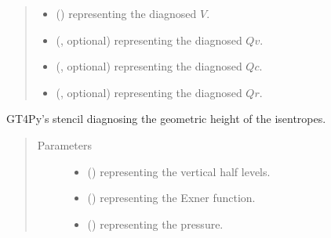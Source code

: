 \documentclass[letterpaper,10pt,english]{sphinxmanual}
\begin{document}
\begin{fulllineitems}
\begin{fulllineitems}
\begin{quote}
\begin{description}
\begin{itemize}
\item {} 
 () \textendash{}  representing the diagnosed \(V\).

\item {} 
 (, optional) \textendash{}  representing the diagnosed \(Qv\).

\item {} 
 (, optional) \textendash{}  representing the diagnosed \(Qc\).

\item {} 
 (, optional) \textendash{}  representing the diagnosed \(Qr\).

\end{itemize}


\end{description}\end{quote}

\end{fulllineitems}


\begin{fulllineitems}
\label{\detokenize{api:dycore.diagnostic_isentropic.DiagnosticIsentropic._defs_stencil_diagnosing_height}}
GT4Py’s stencil diagnosing the geometric height of the isentropes.
\begin{quote}\begin{description}
\item[{Parameters}] \leavevmode\begin{itemize}
\item {} 
 () \textendash{}  representing the vertical half levels.

\item {} 
 () \textendash{}  representing the Exner function.

\item {} 
 () \textendash{}  representing the pressure.


\end{itemize}
\end{description}
\end{quote}
\end{fulllineitems}
\end{fulllineitems}
\end{document}
